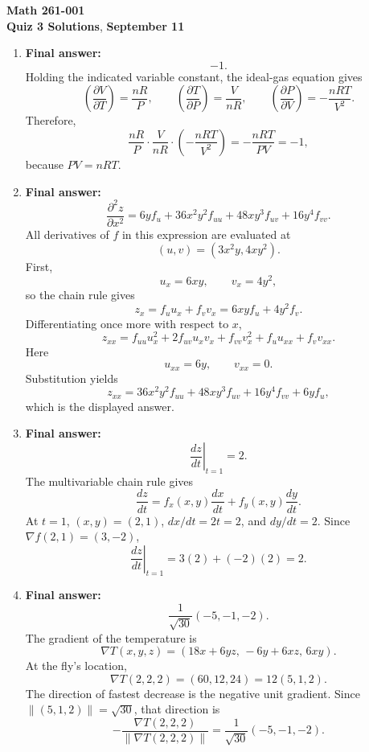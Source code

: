 \documentclass[12pt]{exam}
\newcommand{\class}{Math 261-001}
\newcommand{\examnum}{Quiz 3 Solutions}
\newcommand{\examdate}{September 11}
\begin{document}
\pagestyle{plain}
\thispagestyle{empty}

\noindent
\textbf{\class}\\
\textbf{\examnum}, \textbf{\examdate}

\vspace{10pt}

\small
\begin{enumerate}

\item \textbf{Final answer:}
\[
  \boxed{-1}.
\]
Holding the indicated variable constant, the ideal-gas equation gives
\[
  \left(\frac{\partial V}{\partial T}\right)=\frac{nR}{P},
  \qquad
  \left(\frac{\partial T}{\partial P}\right)=\frac{V}{nR},
  \qquad
  \left(\frac{\partial P}{\partial V}\right)
  =-\frac{nRT}{V^2}.
\]
Therefore,
\[
  \frac{nR}{P}\cdot\frac{V}{nR}\cdot
  \left(-\frac{nRT}{V^2}\right)
  =-\frac{nRT}{PV}=-1,
\]
because $PV=nRT$.

\item \textbf{Final answer:}
\[
  \boxed{
  \frac{\partial^2z}{\partial x^2}
  =6yf_u+36x^2y^2f_{uu}+48xy^3f_{uv}+16y^4f_{vv}}.
\]
All derivatives of $f$ in this expression are evaluated at
\[
  (u,v)=(3x^2y,4xy^2).
\]
First,
\[
  u_x=6xy,\qquad v_x=4y^2,
\]
so the chain rule gives
\[
  z_x=f_u u_x+f_v v_x
  =6xyf_u+4y^2f_v.
\]
Differentiating once more with respect to $x$,
\[
  z_{xx}
  =f_{uu}u_x^2+2f_{uv}u_xv_x+f_{vv}v_x^2
   +f_u u_{xx}+f_v v_{xx}.
\]
Here
\[
  u_{xx}=6y,\qquad v_{xx}=0.
\]
Substitution yields
\[
  z_{xx}
  =36x^2y^2f_{uu}+48xy^3f_{uv}+16y^4f_{vv}+6yf_u,
\]
which is the displayed answer.

\newpage

\item \textbf{Final answer:}
\[
  \boxed{\left.\frac{dz}{dt}\right|_{t=1}=2}.
\]
The multivariable chain rule gives
\[
  \frac{dz}{dt}=f_x(x,y)\frac{dx}{dt}
  +f_y(x,y)\frac{dy}{dt}.
\]
At $t=1$, $(x,y)=(2,1)$, $dx/dt=2t=2$, and $dy/dt=2$. Since
$\nabla f(2,1)=(3,-2)$,
\[
  \left.\frac{dz}{dt}\right|_{t=1}=3(2)+(-2)(2)=2.
\]

\item \textbf{Final answer:}
\[
  \boxed{\frac{1}{\sqrt{30}}(-5,-1,-2)}.
\]
The gradient of the temperature is
\[
  \nabla T(x,y,z)
  =\left(18x+6yz,\,-6y+6xz,\,6xy\right).
\]
At the fly's location,
\[
  \nabla T(2,2,2)=(60,12,24)=12(5,1,2).
\]
The direction of fastest decrease is the negative unit gradient. Since
$\lVert(5,1,2)\rVert=\sqrt{30}$, that direction is
\[
  -\frac{\nabla T(2,2,2)}{\lVert\nabla T(2,2,2)\rVert}
  =\frac{1}{\sqrt{30}}(-5,-1,-2).
\]

\end{enumerate}
\end{document}
